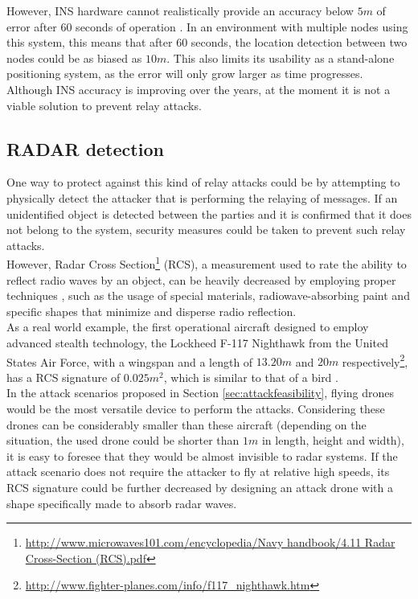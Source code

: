 \documentclass{article}
\begin{document}
However, INS hardware cannot realistically provide an accuracy below $5m$ of error after $60$ seconds of operation \cite{woodman2007introduction}. In an environment with multiple nodes using this system, this means that after $60$ seconds, the location detection between two nodes could be as biased as $10m$. This also limits its usability as a stand-alone positioning system, as the error will only grow larger as time progresses.\\

Although INS accuracy is improving over the years, at the moment it is not a viable solution to prevent relay attacks.\\

\subsection{RADAR detection}

One way to protect against this kind of relay attacks could be by attempting to physically detect the attacker that is performing the relaying of messages. If an unidentified object is detected between the parties and it is confirmed that it does not belong to the system, security measures could be taken to prevent such relay attacks.\\

However, Radar Cross Section\footnote{\url{http://www.microwaves101.com/encyclopedia/Navy handbook/4.11 Radar Cross-Section (RCS).pdf}} (RCS), a measurement used to rate the ability to reflect radio waves by an object, can be heavily decreased by employing proper techniques \cite{cadirci2009rf}, such as the usage of special materials, radiowave-absorbing paint and specific shapes that minimize and disperse radio reflection.\\

As a real world example, the first operational aircraft designed to employ advanced stealth technology, the Lockheed F-117 Nighthawk from the United States Air Force, with a wingspan and a length of $13.20m$ and $20m$ respectively\footnote{\url{http://www.fighter-planes.com/info/f117_nighthawk.htm}}, has a RCS signature of $0.025m^2$, which is similar to that of a bird \cite{cadirci2009rf}.\\

In the attack scenarios proposed in Section \ref{sec:attackfeasibility}, flying drones would be the most versatile device to perform the attacks. Considering these drones can be considerably smaller than these aircraft (depending on the situation, the used drone could be shorter than $1m$ in length, height and width), it is easy to foresee that they would be almost invisible to radar systems. If the attack scenario does not require the attacker to fly at relative high speeds, its RCS signature could be further decreased by designing an attack drone with a shape specifically made to absorb radar waves.\\
\end{document}
